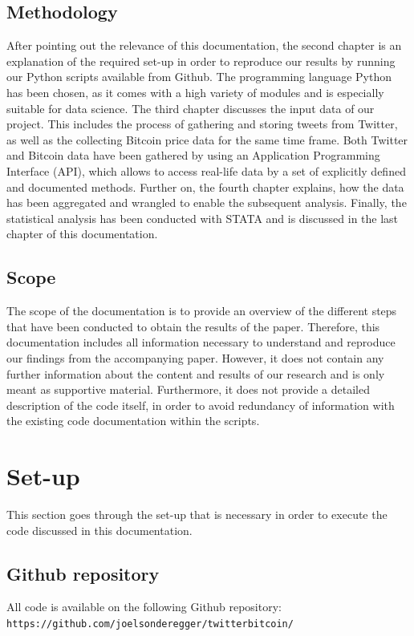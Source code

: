 \documentclass[a4paper,12pt]{article}
\begin{document}
\begin{spacing}{1.2}
\subsection{Methodology}
After pointing out the relevance of this documentation, the second chapter is an explanation of the required set-up in order to reproduce our results by running our Python scripts available from Github. The programming language Python has been chosen, as it comes with a high variety of modules and is especially suitable for data science. The third chapter discusses the input data of our project. This includes the process of gathering and storing tweets from Twitter, as well as the collecting Bitcoin price data for the same time frame. Both Twitter and Bitcoin data have been gathered by using an Application Programming Interface (API), which allows to access real-life data by a set of explicitly defined and documented methods. Further on, the fourth chapter explains, how the data has been aggregated and wrangled to enable the subsequent analysis. Finally, the statistical analysis has been conducted with STATA and is discussed in the last chapter of this documentation.

\subsection{Scope}
The scope of the documentation is to provide an overview of the different steps that have been conducted to obtain the results of the paper. Therefore, this documentation includes all information necessary to understand and reproduce our findings from the accompanying paper. However, it does not contain any further information about the content and results of our research and is only meant as supportive material. Furthermore, it does not provide a detailed description of the code itself, in order to avoid redundancy of information with the existing code documentation within the scripts. 
\clearpage

\section{Set-up}
This section goes through the set-up that is necessary in order to execute the code discussed in this documentation.

\subsection{Github repository}
All code is available on the following Github repository:
\newline
\verb|https://github.com/joelsonderegger/twitterbitcoin/|

\end{spacing}
\end{document}
